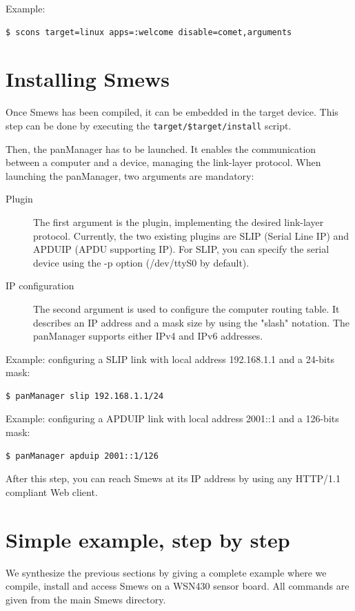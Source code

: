 \documentclass{report}
\begin{document}
Example:
\begin{verbatim}
$ scons target=linux apps=:welcome disable=comet,arguments
\end{verbatim}

\section{Installing Smews}
\label{sec:install}

Once Smews has been compiled, it can be embedded in the target device. This step can be done by executing the \verb+target/$target/install+ script.

Then, the panManager has to be launched. It enables the communication between a computer and a device, managing the link-layer protocol. When launching the panManager, two arguments are mandatory:

\begin{description}
\item[Plugin] The first argument is the plugin, implementing the desired link-layer protocol. Currently, the two existing plugins are SLIP (Serial Line IP) and APDUIP (APDU supporting IP). For SLIP, you can specify the serial device using the -p option (/dev/ttyS0 by default). 
\item[IP configuration] The second argument is used to configure the computer routing table. It describes an IP address and a mask size by using the "slash" notation. The panManager supports either IPv4 and IPv6 addresses.
\end{description}

Example: configuring a SLIP link with local address 192.168.1.1 and a 24-bits mask:
\begin{verbatim}
$ panManager slip 192.168.1.1/24
\end{verbatim}

Example: configuring a APDUIP link with local address 2001::1 and a 126-bits mask:
\begin{verbatim}
$ panManager apduip 2001::1/126
\end{verbatim}

After this step, you can reach Smews at its IP address by using any HTTP/1.1 compliant Web client.

\section{Simple example, step by step}

We synthesize the previous sections by giving a complete example where we compile, install and access Smews on a WSN430 sensor board. All commands are given from the main Smews directory.
\end{document}
